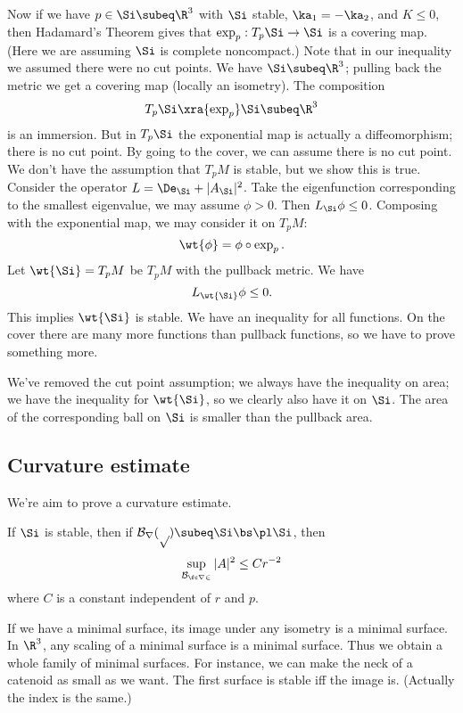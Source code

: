 Now if we have $p\in \Si\subeq \R^3$ with $\Si$ stable, $\ka_1=-\ka_2$, and $K\le 0$, then Hadamard's Theorem gives that $\exp_p:T_p\Si\to \Si$ is a covering map. (Here we are assuming $\Si$ is complete noncompact.) Note that in our inequality we assumed there were no cut points. 
We have $\Si\subeq \R^3$; pulling back the metric we get a covering map (locally an isometry). The composition
\[
T_p\Si\xra{\exp_p} \Si\subeq \R^3
\]
is an immersion. But in $T_p\Si$ the exponential map is actually a diffeomorphism; there is no cut point. By going to the cover, we can assume there is no cut point. We don't have the assumption that $T_pM$ is stable, but we show this is true. Consider the operator $L=\De_{\Si}+|A_{\Si}|^2$. Take the eigenfunction corresponding to the smallest eigenvalue, we may assume $\phi>0$. Then $L_{\Si}\phi\le 0$. Composing with the exponential map, we may consider it on $T_pM$:
\[
\wt{\phi}=\phi\circ \exp_p.
\]
Let $\wt{\Si}=T_pM$ be $T_pM$ with the pullback metric. We have %
\[
L_{\wt{\Si}}\phi\le 0.
\]
This implies $\wt{\Si}$ is stable.
We have an inequality for all functions. On the cover there are many more functions than pullback functions, so we have to prove something more.

We've removed the cut point assumption; we always have the inequality on area; we have the inequality for $\wt{\Si}$, so we clearly also have it on $\Si$. The area of the corresponding ball on $\Si$ is smaller than the pullback area. %

\subsection{Curvature estimate}

We're aim to prove a curvature estimate. 
\begin{thm}
If $\Si$ is stable, then if $\cal B_r(p)\subeq \Si\bs \pl \Si$, then
\[
\sup_{\cal B_{\fc r2}}|A|^2\le Cr^{-2}
\]
where $C$ is a constant independent of $r$ and $p$.
\end{thm}
If we have a minimal surface, its image under any isometry is a minimal surface. In $\R^3$, any scaling of a minimal surface is a minimal surface. Thus we obtain a whole family of minimal surfaces. For instance, we can make the neck of a catenoid as small as we want.
The first surface is stable iff the image is. (Actually the index is the same.)

